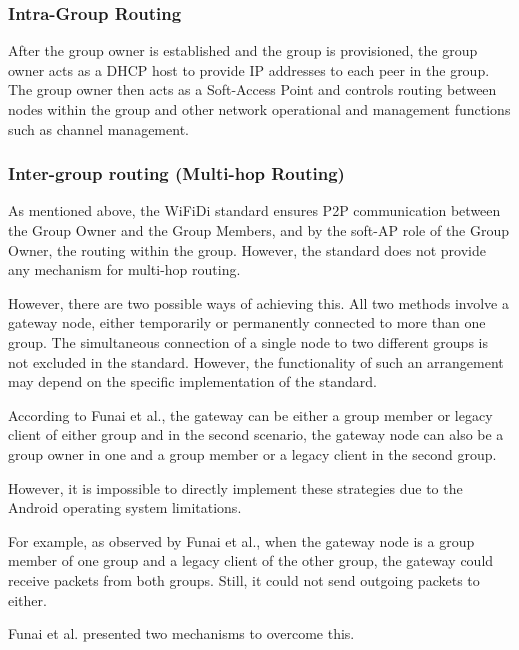 \documentclass[12pt, conference, onecolumn, a4paper]{IEEEtran}
\begin{document}
\subsubsection{Intra-Group Routing}

After the group owner is established and the group is provisioned, the group
owner acts as a DHCP host to provide IP addresses to each peer in the
group\cite{funai2015}. The group owner then acts as a Soft-Access Point and
controls routing between nodes within the group and other network operational
and management functions such as channel management\cite{wifidispec}.

\subsubsection{Inter-group routing (Multi-hop Routing)}

As mentioned above, the WiFiDi standard ensures P2P communication between the
Group Owner and the Group Members, and by the soft-AP role of the Group Owner,
the routing within the group. However, the standard does not provide any
mechanism for multi-hop routing.

However, there are two possible ways of achieving this. All two methods involve
a gateway node, either temporarily or permanently connected to more than one
group. The simultaneous connection of a single node to two different groups is
not excluded in the standard. However, the functionality of such an arrangement
may depend on the specific implementation of the standard\cite{funai2015}.

According to Funai et al., the gateway can be either a group member or legacy
client of either group and in the second scenario, the gateway node can also be
a group owner in one and a group member or a legacy client in the second
group\cite{funai2015}.

However, it is impossible to directly implement these strategies due to the
Android operating system limitations.

For example, as observed by Funai et al., when the gateway node is a group
member of one group and a legacy client of the other group, the gateway could
receive packets from both groups. Still, it could not send outgoing packets to
either\cite{funai2015}.

Funai et al.\cite{funai2015} presented two mechanisms to overcome this.
\end{document}
